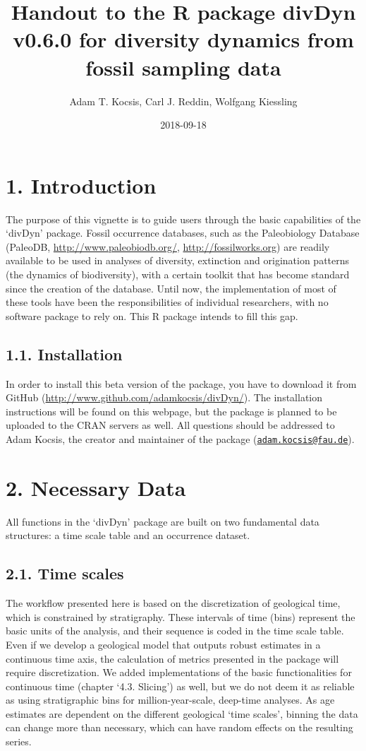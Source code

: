 \documentclass[]{article}
\title{Handout to the R package divDyn v0.6.0 for diversity dynamics from
fossil sampling data}
\author{Adam T. Kocsis, Carl J. Reddin, Wolfgang Kiessling}
\date{2018-09-18}
\begin{document}
\maketitle

\section{1. Introduction}\label{introduction}

The purpose of this vignette is to guide users through the basic
capabilities of the `divDyn' package. Fossil occurrence databases, such
as the Paleobiology Database (PaleoDB, \url{http://www.paleobiodb.org/},
\url{http://fossilworks.org}) are readily available to be used in
analyses of diversity, extinction and origination patterns (the dynamics
of biodiversity), with a certain toolkit that has become standard since
the creation of the database. Until now, the implementation of most of
these tools have been the responsibilities of individual researchers,
with no software package to rely on. This R package intends to fill this
gap.

\subsection{1.1. Installation}\label{installation}

In order to install this beta version of the package, you have to
download it from GitHub
(\url{http://www.github.com/adamkocsis/divDyn/}). The installation
instructions will be found on this webpage, but the package is planned
to be uploaded to the CRAN servers as well. All questions should be
addressed to Adam Kocsis, the creator and maintainer of the package
(\href{mailto:adam.kocsis@fau.de}{\nolinkurl{adam.kocsis@fau.de}}).

\section{2. Necessary Data}\label{necessary-data}

All functions in the `divDyn' package are built on two fundamental data
structures: a time scale table and an occurrence dataset.

\subsection{2.1. Time scales}\label{time-scales}

The workflow presented here is based on the discretization of geological
time, which is constrained by stratigraphy. These intervals of time
(bins) represent the basic units of the analysis, and their sequence is
coded in the time scale table. Even if we develop a geological model
that outputs robust estimates in a continuous time axis, the calculation
of metrics presented in the package will require discretization. We
added implementations of the basic functionalities for continuous time
(chapter `4.3. Slicing') as well, but we do not deem it as reliable as
using stratigraphic bins for million-year-scale, deep-time analyses. As
age estimates are dependent on the different geological `time scales',
binning the data can change more than necessary, which can have random
effects on the resulting series.
\end{document}
